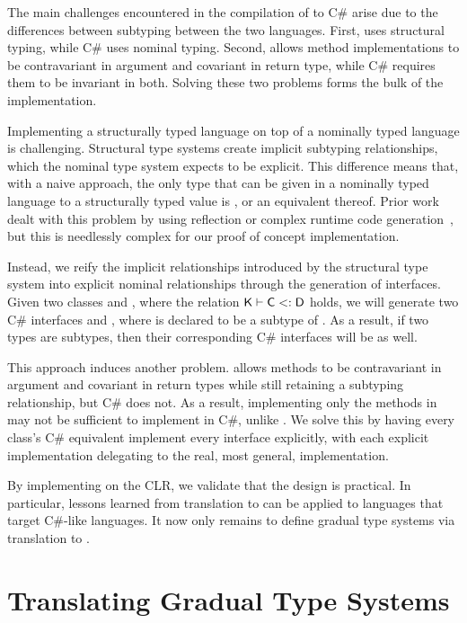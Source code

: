 \documentclass[USenglish]{tex/lipics-v2016}
\begin{document}
The main challenges encountered in the compilation of \kafka to C\# arise due
to the differences between subtyping between the two languages. First, \kafka
uses structural typing, while C\# uses nominal typing. Second, \kafka allows
method implementations to be contravariant in argument and covariant in return
type, while C\# requires them to be invariant in both. Solving these two
problems  forms the bulk of the implementation.

Implementing a structurally typed language on top of a nominally typed
language is challenging. Structural type systems create implicit subtyping
relationships, which the nominal type system expects to be explicit. This
difference means that, with a naive approach, the only type that can be given
in a nominally typed language to a structurally typed value is , or
an equivalent thereof. Prior work dealt with this problem by using reflection
or complex runtime code generation~\cite{StructuralTypesOnJVM}, but this is
needlessly complex for our proof of concept implementation.

Instead, we reify the implicit relationships introduced by the structural type
system into explicit nominal relationships through the generation of
interfaces. Given two \kafka classes \C and \D, where the relation $\K\vdash
\C \Sub \D$ holds, we will generate two C\# interfaces  and , 
where  is declared to be a subtype of . As a result, if two
\kafka types are subtypes, then their corresponding C\# interfaces will be
as well.

This approach induces another problem. \kafka allows methods to be
contravariant in argument and covariant in return types while still retaining
a subtyping relationship, but C\# does not. As a result, implementing only the
methods in  may not be sufficient to implement  in C\#, unlike
\kafka. We solve this by having every \kafka class's C\# equivalent implement
every interface explicitly, with each explicit implementation delegating to
the real, most general, implementation.

By implementing \kafka on the CLR, we validate that the \kafka design is
practical. In particular, lessons learned from translation to \kafka can be
applied to languages that target C\#-like languages. It now only remains to
define gradual type systems via translation to \kafka.

\section{Translating Gradual Type Systems}
\end{document}
